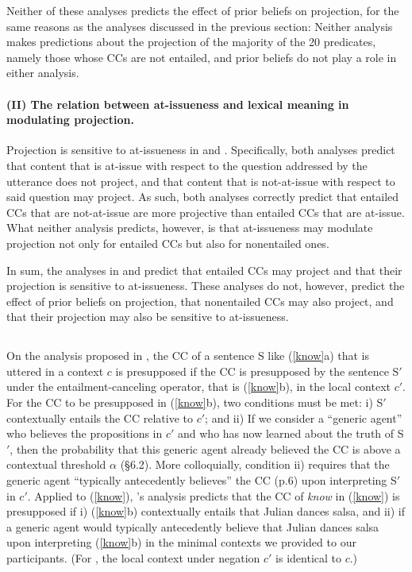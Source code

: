 \documentclass[11pt,fleqn]{article}
\newcommand{\6}{\mbox{$[\hspace*{-.6mm}[$}}
\newcommand{\9}{\mbox{$]\hspace*{-.6mm}]$}}
\newcommand{\citepos}[1]{\citeauthor{#1}'s \citeyear{#1}}
\begin{document}
Neither of these analyses predicts the effect of prior beliefs on projection, for the same reasons as the analyses discussed in the previous section: Neither analysis makes predictions about the projection of the majority of the 20 predicates, namely those whose CCs are not entailed, and prior beliefs do not play a role in either analysis.

\paragraph{(II) The relation between at-issueness and lexical meaning in modulating projection.}

Projection is sensitive to at-issueness in \citealt{abrusan2011,abrusan2016} and \citealt{best-question}. Specifically, both analyses predict that content that is at-issue with respect to the question addressed by the utterance does not project, and that content that is not-at-issue with respect to said question may project. As such, both analyses correctly predict that entailed CCs that are not-at-issue are more projective than entailed CCs that are at-issue. What neither analysis predicts, however, is that at-issueness may modulate projection not only for entailed CCs but also for nonentailed ones. 

\bigskip

In sum, the analyses in \citealt{abrusan2011,abrusan2016} and \citealt{best-question} predict that entailed CCs may project and that their projection is sensitive to at-issueness.  These analyses do not, however, predict the effect of prior beliefs on projection, that nonentailed CCs may also project, and that their projection may also be sensitive to at-issueness.

\subsection{\citealt{schlenker2021}}

On the analysis proposed in \citealt{schlenker2021}, the CC of a sentence S like (\ref{know}a) that is uttered in a context $c$ is presupposed if the CC is presupposed by the sentence S$'$under the entailment-canceling operator, that is (\ref{know}b), in the local context $c'$. For the CC to be presupposed in (\ref{know}b), two conditions must be met: i) S$'$ contextually entails the CC relative to $c'$; and ii) If we consider a ``generic agent'' who believes the propositions in $c'$ and who has now learned about the truth of S$'$, then the probability that this generic agent already believed the CC is above a contextual threshold $\alpha$ (\S6.2). More colloquially, condition ii) requires that the generic agent ``typically antecedently believes'' the CC (p.6) upon interpreting S$'$ in $c'$. Applied to (\ref{know}), \citepos{schlenker2021} analysis predicts that the CC of \emph{know} in (\ref{know})  is presupposed if i) (\ref{know}b) contextually entails that Julian dances salsa, and ii) if a generic agent would typically antecedently believe that Julian dances salsa upon interpreting (\ref{know}b) in the minimal contexts we provided to our participants. (For \citealt{schlenker2021}, the local context under negation $c'$ is identical to $c$.)
\end{document}
